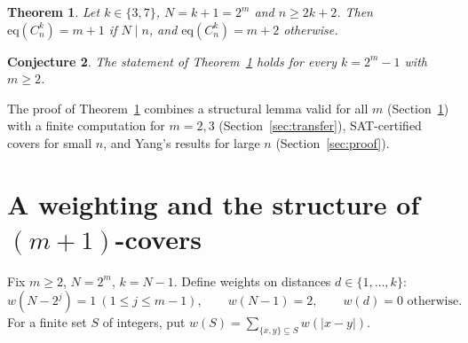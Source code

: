 \documentclass[11pt]{article}
\newtheorem{theorem}{Theorem}
\newtheorem{conjecture}[theorem]{Conjecture}
\theoremstyle{remark}
\begin{document}
\begin{theorem}\label{thm:main}
Let $k\in\{3,7\}$, $N=k+1=2^m$ and $n\ge 2k+2$. Then $\mathrm{eq}(C_n^k)=m+1$ if $N\mid n$, and $\mathrm{eq}(C_n^k)=m+2$ otherwise.
\end{theorem}

\begin{conjecture}\label{conj}
The statement of Theorem~\ref{thm:main} holds for every $k=2^m-1$ with $m\ge2$.
\end{conjecture}

The proof of Theorem~\ref{thm:main} combines a structural lemma valid for all $m$ (Section~\ref{sec:weights}) with a finite computation for $m=2,3$ (Section~\ref{sec:transfer}), SAT-certified covers for small $n$, and Yang's results for large $n$ (Section~\ref{sec:proof}).

\section{A weighting and the structure of $(m+1)$-covers}\label{sec:weights}
Fix $m\ge 2$, $N=2^m$, $k=N-1$. Define weights on distances $d\in\{1,\dots,k\}$:
\[ w(N-2^j)=1\ (1\le j\le m-1),\qquad w(N-1)=2,\qquad w(d)=0 \text{ otherwise.}\]
For a finite set $S$ of integers, put $w(S)=\sum_{\{x,y\}\subseteq S}w(|x-y|)$.
\end{document}
